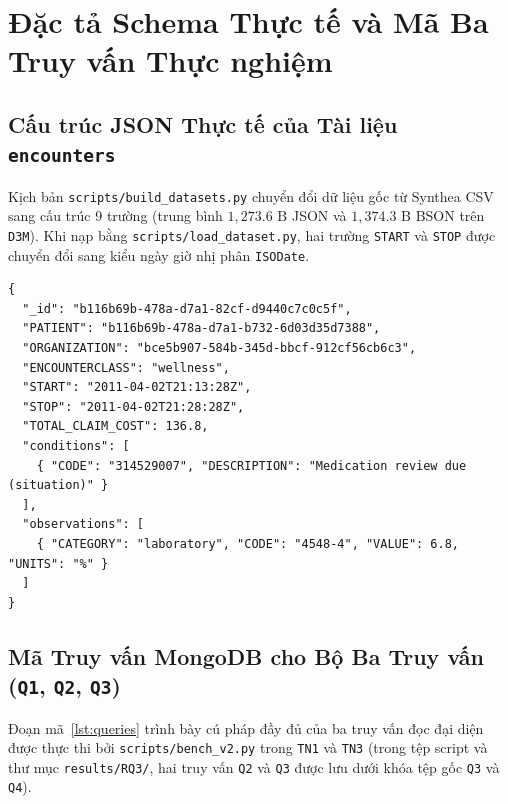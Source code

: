 \chapter{Đặc tả Schema Thực tế và Mã Ba Truy vấn Thực nghiệm}
\label{app:schema}

\section{Cấu trúc JSON Thực tế của Tài liệu \texttt{encounters}}

Kịch bản \texttt{scripts/build\_datasets.py} chuyển đổi dữ liệu gốc từ Synthea CSV sang cấu trúc 9 trường (trung bình $1{,}273.6\text{ B}$ JSON và $1{,}374.3\text{ B}$ BSON trên \texttt{D3M}). Khi nạp bằng \texttt{scripts/load\_dataset.py}, hai trường \texttt{START} và \texttt{STOP} được chuyển đổi sang kiểu ngày giờ nhị phân \texttt{ISODate}.

\begin{lstlisting}[language=MongoJS, caption={Cấu trúc JSON mẫu thực tế của một tài liệu trong collection \texttt{encounters}.}, label={lst:encounter-doc}]
{
  "_id": "b116b69b-478a-d7a1-82cf-d9440c7c0c5f",
  "PATIENT": "b116b69b-478a-d7a1-b732-6d03d35d7388",
  "ORGANIZATION": "bce5b907-584b-345d-bbcf-912cf56cb6c3",
  "ENCOUNTERCLASS": "wellness",
  "START": "2011-04-02T21:13:28Z",
  "STOP": "2011-04-02T21:28:28Z",
  "TOTAL_CLAIM_COST": 136.8,
  "conditions": [
    { "CODE": "314529007", "DESCRIPTION": "Medication review due (situation)" }
  ],
  "observations": [
    { "CATEGORY": "laboratory", "CODE": "4548-4", "VALUE": 6.8, "UNITS": "%" }
  ]
}
\end{lstlisting}

\section{Mã Truy vấn MongoDB cho Bộ Ba Truy vấn (\texttt{Q1}, \texttt{Q2}, \texttt{Q3})}

Đoạn mã~\ref{lst:queries} trình bày cú pháp đầy đủ của ba truy vấn đọc đại diện được thực thi bởi \texttt{scripts/bench\_v2.py} trong \texttt{TN1} và \texttt{TN3} (trong tệp script và thư mục \texttt{results/RQ3/}, hai truy vấn \texttt{Q2} và \texttt{Q3} được lưu dưới khóa tệp gốc \texttt{Q3} và \texttt{Q4}).

